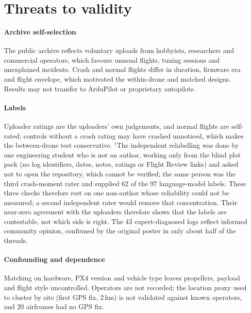 \documentclass[preprint,12pt]{elsarticle}
\begin{document}
\section{Threats to validity}
\label{sec:threats}

\paragraph{Archive self-selection} The public archive reflects voluntary uploads from hobbyists, researchers and commercial operators, which favours unusual flights, tuning sessions and unexplained incidents. Crash and normal flights differ in duration, firmware era and flight envelope, which motivated the within-drone and matched designs. Results may not transfer to ArduPilot or proprietary autopilots.

\paragraph{Labels} Uploader ratings are the uploaders' own judgements, and normal flights are self-rated; controls without a crash rating may have crashed unnoticed, which makes the between-drone test conservative. $^\dagger$The independent relabelling was done by one engineering student who is not an author, working only from the blind plot pack (no log identifiers, dates, notes, ratings or Flight Review links) and asked not to open the repository, which cannot be verified; the same person was the third crash-moment rater and supplied 62 of the 97 language-model labels. These three checks therefore rest on one non-author whose reliability could not be measured; a second independent rater would remove that concentration. Their near-zero agreement with the uploaders therefore shows that the labels are contestable, not which side is right. The 43 expert-diagnosed logs reflect informed community opinion, confirmed by the original poster in only about half of the threads.

\paragraph{Confounding and dependence} Matching on hardware, PX4 version and vehicle type leaves propellers, payload and flight style uncontrolled. Operators are not recorded; the location proxy used to cluster by site (first GPS fix, 2\,km) is not validated against known operators, and 20 airframes had no GPS fix.
\end{document}
